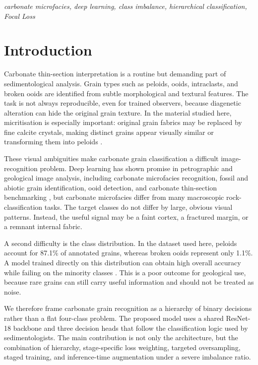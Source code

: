 \documentclass[conference, a4paper]{IEEEtran}
\begin{document}
\renewcommand{\IEEEkeywordsname}{Keywords}
\begin{IEEEkeywords}
\itshape carbonate microfacies, deep learning, class imbalance, hierarchical classification, Focal Loss
\end{IEEEkeywords}

\section{Introduction}
Carbonate thin-section interpretation is a routine but demanding part of sedimentological analysis. Grain types such as peloids, ooids, intraclasts, and broken ooids are identified from subtle morphological and textural features. The task is not always reproducible, even for trained observers, because diagenetic alteration can hide the original grain texture. In the material studied here, micritisation is especially important: original grain fabrics may be replaced by fine calcite crystals, making distinct grains appear visually similar or transforming them into peloids \cite{bathurst1971,flugel2010}.

These visual ambiguities make carbonate grain classification a difficult image-recognition problem. Deep learning has shown promise in petrographic and geological image analysis, including carbonate microfacies recognition, fossil and abiotic grain identification, ooid detection, and carbonate thin-section benchmarking \cite{koeshidayatullah2020,pireslima2020,liu2020,wang2023fasterrcnn,faria2025carbonatic,li2026deepcarbonate}, but carbonate microfacies differ from many macroscopic rock-classification tasks. The target classes do not differ by large, obvious visual patterns. Instead, the useful signal may be a faint cortex, a fractured margin, or a remnant internal fabric.

A second difficulty is the class distribution. In the dataset used here, peloids account for 87.1\% of annotated grains, whereas broken ooids represent only 1.1\%. A model trained directly on this distribution can obtain high overall accuracy while failing on the minority classes \cite{johnson2019imbalance}. This is a poor outcome for geological use, because rare grains can still carry useful information and should not be treated as noise.

We therefore frame carbonate grain recognition as a hierarchy of binary decisions rather than a flat four-class problem. The proposed model uses a shared ResNet-18 backbone and three decision heads that follow the classification logic used by sedimentologists. The main contribution is not only the architecture, but the combination of hierarchy, stage-specific loss weighting, targeted oversampling, staged training, and inference-time augmentation under a severe imbalance ratio.
\end{document}
